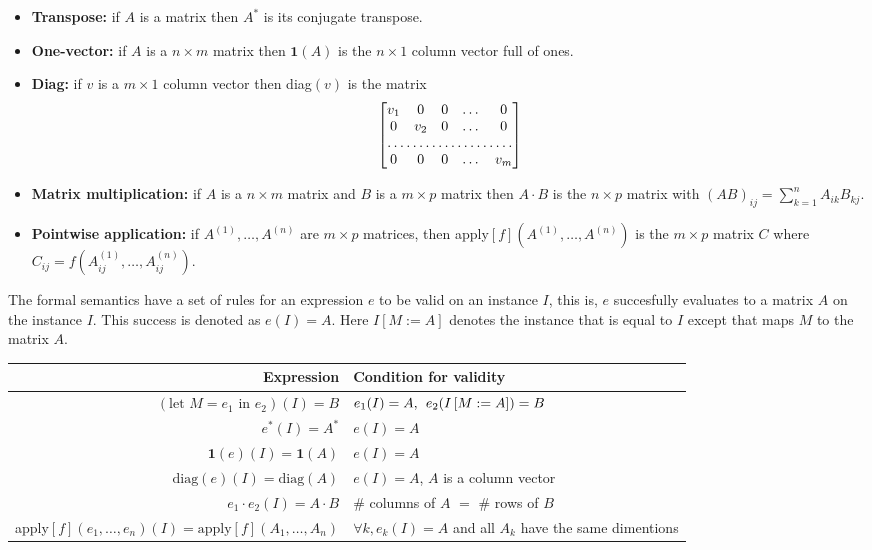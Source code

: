 \begin{itemize}
	\item \textbf{Transpose:} if $A$ is a matrix then $A^*$ is its conjugate transpose.
	\item \textbf{One-vector:} if $A$ is a $n\times m$ matrix then $\mathbf{1}(A)$ is the $n\times 1$ column vector full of ones.
	\item \textbf{Diag:} if $v$ is a $m\times 1$ column vector then diag$(v)$ is the matrix
		\[
			\begin{bmatrix}
			    v_{1}       & 0 & 0 & \dots & 0 \\
			    0       & v_{2} & 0 & \dots & 0 \\
			    \hdotsfor{5} \\
			    0       & 0 & 0 & \dots & v_{m}
			\end{bmatrix}
		\]
	\item \textbf{Matrix multiplication:} if $A$ is a $n\times m$ matrix and $B$ is a $m\times p$ matrix then $A\cdot B$ is the $n\times p$ matrix with $(AB)_{ij}=\sum_{k=1}^n A_{ik}B_{kj}$.
	\item \textbf{Pointwise application:} if $A^{(1)}, \ldots, A^{(n)}$ are $m\times p$ matrices, then apply$\left[ f \right](A^{(1)}, \ldots, A^{(n)})$ is the $m\times p$ matrix $C$ where $C_{ij}=f(A^{(1)}_{ij}, \ldots, A^{(n)}_{ij})$.
\end{itemize}
	
	The formal semantics have a set of rules for an expression $e$ to be valid on an instance $I$, this is, $e$ succesfully evaluates to a matrix $A$ on the instance $I$. This success is denoted as $e(I)=A$. Here $I\left[ M:=A\right]$ denotes the instance that is equal to $I$ except that maps $M$ to the matrix $A$.
	
	\begin{center}
    \begin{tabular}{ r | l }
    \hline
    \textbf{Expression} & \textbf{Condition for validity}\\ \hline
    $(\text{let } M=e_1 \text{ in } e_2)(I)=B$ & $e_1(I)=A,\hspace{1ex}e_2(I\left[ M:=A\right])=B$ \\ 
    $e^*(I)=A^*$ & $e(I)=A$ \\
    $\mathbf{1}(e)(I)=\mathbf{1}(A)$ & $e(I)=A$ \\
    $\text{diag}(e)(I)=\text{diag}(A)$ & $e(I)=A$, $A$ is a column vector \\
    $e_1\cdot e_2(I)=A\cdot B$ & \# columns of $A$ $=$ \# rows of $B$ \\
    apply$\left[ f\right](e_1, \ldots, e_n)(I)=\text{apply}\left[ f\right](A_1, \ldots, A_n)$ & $\forall k, e_k(I)=A$ and all $A_k$ have the same dimentions \\
    \end{tabular}
\end{center}

\label{sec:matlang}